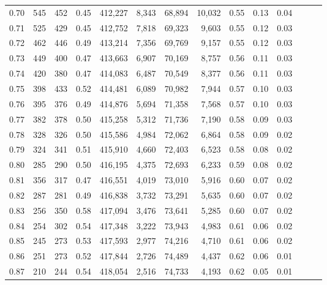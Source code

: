 \begin{tabular}{rrrrrrrrrrrrrr}
0.70 &     545 &    452 &  0.45 &  412,227 &    8,343 &  68,894 &  10,032 &  0.55 &  0.13 &      0.04 \\
0.71 &     525 &    429 &  0.45 &  412,752 &    7,818 &  69,323 &   9,603 &  0.55 &  0.12 &      0.03 \\
0.72 &     462 &    446 &  0.49 &  413,214 &    7,356 &  69,769 &   9,157 &  0.55 &  0.12 &      0.03 \\
0.73 &     449 &    400 &  0.47 &  413,663 &    6,907 &  70,169 &   8,757 &  0.56 &  0.11 &      0.03 \\
0.74 &     420 &    380 &  0.47 &  414,083 &    6,487 &  70,549 &   8,377 &  0.56 &  0.11 &      0.03 \\
0.75 &     398 &    433 &  0.52 &  414,481 &    6,089 &  70,982 &   7,944 &  0.57 &  0.10 &      0.03 \\
0.76 &     395 &    376 &  0.49 &  414,876 &    5,694 &  71,358 &   7,568 &  0.57 &  0.10 &      0.03 \\
0.77 &     382 &    378 &  0.50 &  415,258 &    5,312 &  71,736 &   7,190 &  0.58 &  0.09 &      0.03 \\
0.78 &     328 &    326 &  0.50 &  415,586 &    4,984 &  72,062 &   6,864 &  0.58 &  0.09 &      0.02 \\
0.79 &     324 &    341 &  0.51 &  415,910 &    4,660 &  72,403 &   6,523 &  0.58 &  0.08 &      0.02 \\
0.80 &     285 &    290 &  0.50 &  416,195 &    4,375 &  72,693 &   6,233 &  0.59 &  0.08 &      0.02 \\
0.81 &     356 &    317 &  0.47 &  416,551 &    4,019 &  73,010 &   5,916 &  0.60 &  0.07 &      0.02 \\
0.82 &     287 &    281 &  0.49 &  416,838 &    3,732 &  73,291 &   5,635 &  0.60 &  0.07 &      0.02 \\
0.83 &     256 &    350 &  0.58 &  417,094 &    3,476 &  73,641 &   5,285 &  0.60 &  0.07 &      0.02 \\
0.84 &     254 &    302 &  0.54 &  417,348 &    3,222 &  73,943 &   4,983 &  0.61 &  0.06 &      0.02 \\
0.85 &     245 &    273 &  0.53 &  417,593 &    2,977 &  74,216 &   4,710 &  0.61 &  0.06 &      0.02 \\
0.86 &     251 &    273 &  0.52 &  417,844 &    2,726 &  74,489 &   4,437 &  0.62 &  0.06 &      0.01 \\
0.87 &     210 &    244 &  0.54 &  418,054 &    2,516 &  74,733 &   4,193 &  0.62 &  0.05 &      0.01 \\

\end{tabular}
